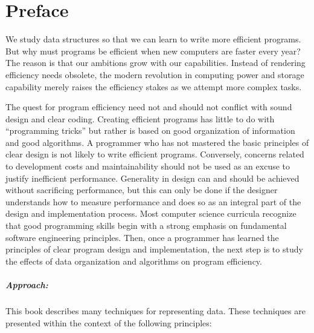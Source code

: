 
\chapter*{Preface}
\label{Preface}

We study data structures so that we can learn to write more efficient
programs.
But why must programs be efficient when new computers are faster every
year?
The reason is that our ambitions grow with our capabilities.
Instead of rendering efficiency needs obsolete, the modern revolution
in computing power and storage capability merely raises the efficiency
stakes as we attempt more complex tasks.

The quest for program efficiency need not and should not conflict with
sound design and clear coding.
Creating efficient programs has little to do with ``programming
tricks'' but rather is based on good organization of information and
good algorithms.
A programmer who has not mastered the basic principles of clear design
is not likely to write efficient programs.
Conversely, concerns related to development costs and maintainability
should not be used as an excuse to justify inefficient performance.
Generality in design can and should be achieved without sacrificing
performance, but this can only be done if the designer understands how
to measure performance and does so as an integral part of the design
and implementation process.
Most computer science curricula recognize that good programming
skills begin with a strong emphasis on fundamental software
engineering principles.
Then, once a programmer has learned the principles of clear
program design and implementation, the next step is to study
the effects of data organization and algorithms on program efficiency.

\paragraph{Approach:}
This book describes many techniques for representing data.
These techniques are presented within the context of
the following principles:

